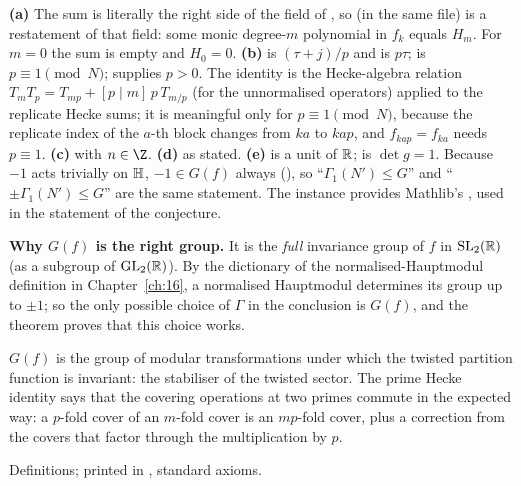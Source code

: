 \begin{dictionary}
\textbf{(a)} The sum is literally the right side of the field  of , so
 (in the same file) is a restatement of that field: some monic degree-$m$
polynomial in $f_k$ equals $H_m$.  For $m=0$ the sum is empty and $H_0=0$.  \textbf{(b)}  is
$(\tau+j)/p$ and  is $p\tau$;  is $p\equiv1\pmod N$;  supplies $p>0$.  The
identity is the Hecke-algebra relation $T_mT_p=T_{mp}+[p\mid m]\,p\,T_{m/p}$ (for the unnormalised operators) applied to the
replicate Hecke sums; it is meaningful only for $p\equiv1\pmod N$, because the replicate index of the $a$-th block changes from
$ka$ to $kap$, and $f_{kap}=f_{ka}$ needs $p\equiv1$.  \textbf{(c)}  with $n\in\Z$.  \textbf{(d)} as
stated.  \textbf{(e)}  is a unit of $\mathbb{R}$;  is $\det g=1$.  Because $-1$ acts trivially on
$\mathbb{H}$, $-1\in G(f)$ always (), so ``$\Gamma_1(N')\le G$'' and ``$\pm\Gamma_1(N')\le G$'' are the
same statement.  The instance  provides Mathlib's , used in the statement of
the conjecture.

\textbf{Why $G(f)$ is the right group.}  It is the \emph{full} invariance group of $f$ in $\mathrm{SL}_2(\mathbb{R})$ (as a subgroup of
$\mathrm{GL}_2(\mathbb{R})$).  By the dictionary of the normalised-Hauptmodul definition in Chapter~\ref{ch:16}, a normalised Hauptmodul
determines its group up to $\pm1$; so the only possible choice of $\Gamma$ in the conclusion is $G(f)$, and the theorem
proves that this choice works.
\end{dictionary}
\begin{physics}
$G(f)$ is the group of modular transformations under which the twisted partition function is invariant: the stabiliser of
the twisted sector.  The prime Hecke identity says that the covering operations at two primes commute in the expected way:
a $p$-fold cover of an $m$-fold cover is an $mp$-fold cover, plus a correction from the covers that factor through the
multiplication by $p$.
\end{physics}
\begin{status}Definitions; printed in , standard axioms.\end{status}

